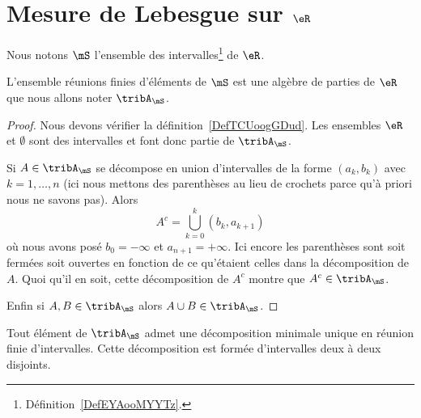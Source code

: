 
\section{Mesure de Lebesgue sur \texorpdfstring{$ \eR$}{R}}
\label{SecZTFooXlkwk}

Nous notons \( \mS\) l'ensemble des intervalles\footnote{Définition~\ref{DefEYAooMYYTz}.} de \( \eR\).

\begin{proposition}
    L'ensemble réunions finies d'éléments de \( \mS\) est une algèbre de parties de \( \eR\) que nous allons noter \( \tribA_{\mS}\).
\end{proposition}

\begin{proof}

    Nous devons vérifier la définition~\ref{DefTCUoogGDud}. Les ensembles \( \eR\) et \( \emptyset\) sont des intervalles et font donc partie de \( \tribA_{\mS}\).

    Si \( A\in\tribA_{\mS}\) se décompose en union d'intervalles de la forme \( (a_k,b_k)\) avec \( k=1,\ldots, n\) (ici nous mettons des parenthèses au lieu de crochets parce qu'à priori nous ne savons pas). Alors
    \begin{equation}
        A^c=\bigcup_{k=0}^{k}(b_k,a_{k+1})
    \end{equation}
    où nous avons posé \( b_0=-\infty\) et \( a_{n+1}=+\infty\). Ici encore les parenthèses sont soit fermées soit ouvertes en fonction de ce qu'étaient celles dans la décomposition de \( A\). Quoi qu'il en soit, cette décomposition de \( A^c\) montre que \( A^c\in\tribA_{\mS}\).

    Enfin si \( A,B\in\tribA_{\mS}\) alors \( A\cup B\in\tribA_{\mS}\).
\end{proof}

\begin{lemma}
    Tout élément de \( \tribA_{\mS}\) admet une décomposition minimale unique en réunion finie d'intervalles. Cette décomposition est formée d'intervalles deux à deux disjoints.
\end{lemma}

